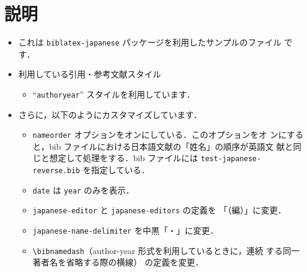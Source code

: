 \documentclass[10pt]{jlreq}
\renewcommand{\bibnamedash}{%
  \hskip.2em \leavevmode\rule[.5ex]{2.5em}{.3pt}\hskip0.4em}
\begin{document}
\section{説明}

\begin{itemize}
 \item これは \texttt{biblatex-japanese} パッケージを利用したサンプルのファイル
       です．
 \item 利用している引用・参考文献スタイル
       \begin{itemize}
        \item ``\texttt{authoryear}'' スタイルを利用しています．
       \end{itemize}
 \item さらに，以下のようにカスタマイズしています．
       \begin{itemize}
        \item \texttt{nameorder} オプションをオンにしている．このオプションをオ
              ンにすると，bib ファイルにおける日本語文献の「姓名」の順序が英語文
              献と同じと想定して処理をする．bib ファイルには
              \texttt{test-japanese-reverse.bib} を指定している．
        \item \texttt{date} は \texttt{year} のみを表示．
        \item \texttt{japanese-editor} と \texttt{japanese-editors} の定義を
              「（編）」に変更．
        \item \texttt{japanese-name-delimiter} を中黒「・」に変更．
        \item \verb|\bibnamedash|（author-year 形式を利用しているときに，連続
              する同一著者名を省略する際の横線） の定義を変更．
       \end{itemize}
\end{itemize}


\end{document}
